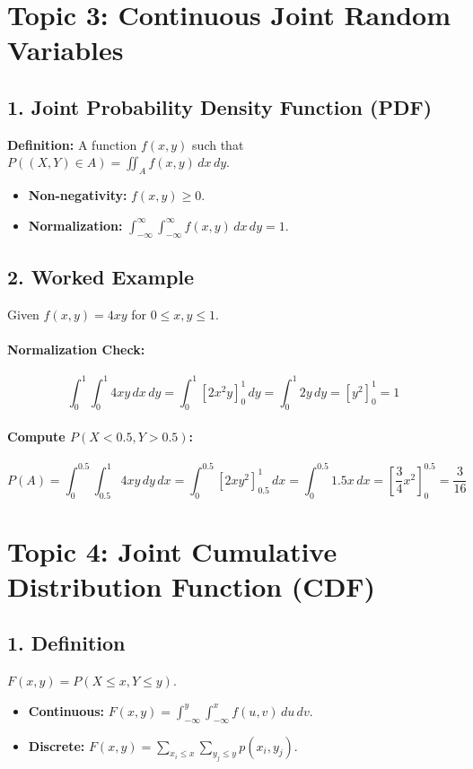 \documentclass[12pt]{article}
\begin{document}
\section*{Topic 3: Continuous Joint Random Variables}

\subsection*{1. Joint Probability Density Function (PDF)}
\textbf{Definition:} A function $f(x,y)$ such that $P((X,Y) \in A) = \iint_A f(x,y) \,dx\,dy$.
\begin{itemize}
    \item \textbf{Non-negativity:} $f(x,y) \ge 0$.
    \item \textbf{Normalization:} $\int_{-\infty}^{\infty} \int_{-\infty}^{\infty} f(x,y) \,dx\,dy = 1$.
\end{itemize}

\subsection*{2. Worked Example}
Given $f(x,y) = 4xy$ for $0 \le x, y \le 1$.
\paragraph{Normalization Check:}
\[ \int_{0}^{1} \int_{0}^{1} 4xy \,dx\,dy = \int_{0}^{1} [2x^2y]_{0}^{1} \,dy = \int_{0}^{1} 2y \,dy = [y^2]_{0}^{1} = 1 \]
\paragraph{Compute $P(X < 0.5, Y > 0.5)$:}
\[ P(A) = \int_{0}^{0.5} \int_{0.5}^{1} 4xy \,dy\,dx = \int_{0}^{0.5} [2xy^2]_{0.5}^{1} \,dx = \int_{0}^{0.5} 1.5x \,dx = [\frac{3}{4}x^2]_{0}^{0.5} = \frac{3}{16} \]

\section*{Topic 4: Joint Cumulative Distribution Function (CDF)}

\subsection*{1. Definition}
$F(x,y) = P(X \le x, Y \le y)$.
\begin{itemize}
    \item \textbf{Continuous:} $F(x,y) = \int_{-\infty}^{y} \int_{-\infty}^{x} f(u,v) \,du\,dv$.
    \item \textbf{Discrete:} $F(x,y) = \sum_{x_i \le x} \sum_{y_j \le y} p(x_i, y_j)$.
\end{itemize}
\end{document}
